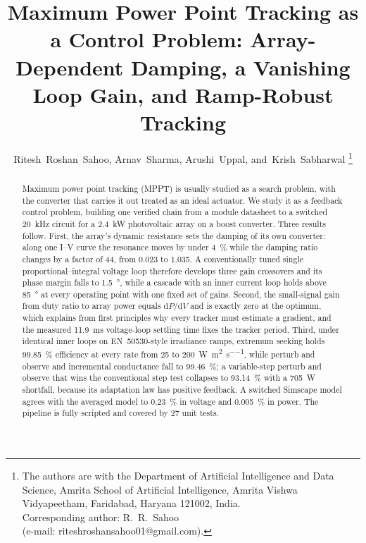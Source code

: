 \documentclass[journal]{IEEEtran}
\newcommand{\Wms}{\si{\watt\per\square\metre\per\second}}
\begin{document}
\title{Maximum Power Point Tracking as a Control Problem: Array-Dependent Damping, a Vanishing Loop Gain,
and Ramp-Robust Tracking}
\author{Ritesh~Roshan~Sahoo,
Arnav~Sharma,
Arushi~Uppal,
and~Krish~Sabharwal%
\thanks{The authors are with the Department of Artificial Intelligence and Data Science, Amrita School
of Artificial Intelligence, Amrita Vishwa Vidyapeetham, Faridabad, Haryana 121002, India.\protect\\
Corresponding author: R.~R.~Sahoo \protect\\ (e-mail: \mbox{riteshroshansahoo01@gmail.com}).}}
\maketitle

\begin{abstract}
Maximum power point tracking (MPPT) is usually studied as a search problem, with the converter that
carries it out treated as an ideal actuator. We study it as a feedback control problem, building one
verified chain from a module datasheet to a switched \SI{20}{\kilo\hertz} circuit for a
\SI{2.4}{\kilo\watt} photovoltaic array on a boost converter. Three results follow. First, the array's
dynamic resistance sets the damping of its own converter: along one I--V curve the resonance moves by under
\SI{4}{\percent} while the damping ratio changes by a factor of 44, from 0.023 to 1.035. A conventionally
tuned single proportional--integral voltage loop therefore develops three gain crossovers and its phase
margin falls to \SI{1.5}{\degree}, while a cascade with an inner current loop holds above \SI{85}{\degree}
at every operating point with one fixed set of gains. Second, the small-signal gain from duty ratio to
array power equals $\mathrm{d}P/\mathrm{d}V$ and is exactly zero at the optimum, which explains from first
principles why every tracker must estimate a gradient, and the measured \SI{11.9}{\milli\second} voltage-loop
settling time fixes the tracker period. Third, under identical inner loops on EN~50530-style irradiance
ramps, extremum seeking holds \SI{99.85}{\percent} efficiency at every rate from 25 to \SI{200}{\Wms},
while perturb and observe and incremental conductance fall to \SI{99.46}{\percent}; a variable-step perturb
and observe that wins the conventional step test collapses to \SI{93.14}{\percent} with a \SI{705}{\watt}
shortfall, because its adaptation law has positive feedback. A switched Simscape model agrees with the
averaged model to \SI{0.23}{\percent} in voltage and \SI{0.005}{\percent} in power. The pipeline is fully
scripted and covered by 27 unit tests.
\end{abstract}
\end{document}
